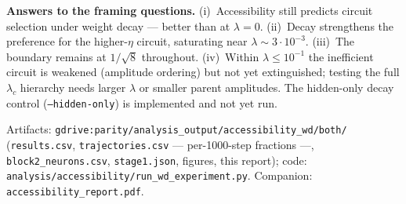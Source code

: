 \documentclass[10pt]{article}
\begin{document}
\textbf{Answers to the framing questions.} (i)~Accessibility still predicts circuit selection
under weight decay --- better than at $\lambda=0$. (ii)~Decay strengthens the preference for the
higher-$\eta$ circuit, saturating near $\lambda\sim3{\cdot}10^{-3}$. (iii)~The boundary remains
at $1/\sqrt8$ throughout. (iv)~Within $\lambda\leq10^{-1}$ the inefficient circuit is weakened
(amplitude ordering) but not yet extinguished; testing the full $\lambda_c$ hierarchy needs
larger $\lambda$ or smaller parent amplitudes. The hidden-only decay control
(\texttt{--hidden-only}) is implemented and not yet run.

\vspace{2pt}\footnotesize
Artifacts: \texttt{gdrive:parity/analysis\_output/accessibility\_wd/both/} (\texttt{results.csv},
\texttt{trajectories.csv} --- per-1000-step fractions ---, \texttt{block2\_neurons.csv},
\texttt{stage1.json}, figures, this report); code:
\texttt{analysis/accessibility/run\_wd\_experiment.py}. Companion: \texttt{accessibility\_report.pdf}.
\end{document}
